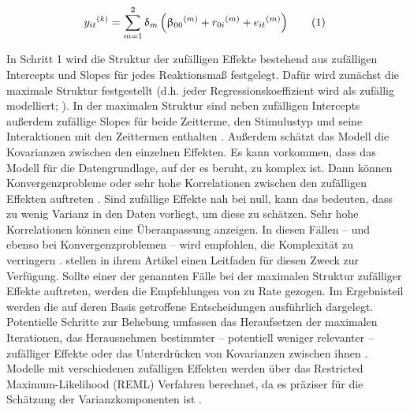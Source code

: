 		\begin{equation*}
			y_{it}{}^{(k)}=\sum^2_{m=1} \updelta_m \left( \upbeta_{00}{}^{(m)}+ 		
			r_{0i}{}^{(m)}+e_{it}{}^{(m)}\right)\nr\label{eq:null2}
		\end{equation*}
	
		In Schritt 1 wird die Struktur der zufälligen Effekte bestehend aus zufälligen Intercepts und Slopes für jedes Reaktionsmaß festgelegt. 
		Dafür wird zunächst die maximale Struktur festgestellt (d.h. jeder Regressionskoeffizient wird als zufällig modelliert; ).
		In der maximalen Struktur sind neben zufälligen Intercepts außerdem zufällige Slopes für beide Zeitterme, den Stimulustyp und seine Interaktionen mit den Zeittermen enthalten \parencite{BRAUER2018}.
		Außerdem schätzt das Modell die Kovarianzen zwischen den einzelnen Effekten.
		Es kann vorkommen, dass das Modell für die Datengrundlage, auf der es beruht, zu komplex ist. Dann können Konvergenzprobleme oder sehr hohe Korrelationen zwischen den zufälligen Effekten auftreten \parencite{BRAUER2018, MATUSCHEK2017}.
		Sind zufällige Effekte nah bei null, kann das bedeuten, dass zu wenig Varianz in den Daten vorliegt, um diese zu schätzen. Sehr hohe Korrelationen können eine Überanpassung anzeigen.
		In diesen Fällen -- und ebenso bei Konvergenzproblemen -- wird empfohlen, die Komplexität zu verringern \parencite{BRAUER2018, MATUSCHEK2017}. 
		\textcite{BRAUER2018} stellen in ihrem Artikel einen Leitfaden für diesen Zweck zur Verfügung. Sollte einer der genannten Fälle bei der maximalen Struktur zufälliger Effekte auftreten, werden die Empfehlungen von \textcite{BRAUER2018} zu Rate gezogen. Im Ergebnisteil werden die auf deren Basis getroffene Entscheidungen ausführlich dargelegt. Potentielle Schritte zur Behebung umfassen das Heraufsetzen der maximalen Iterationen, das Herausnehmen bestimmter -- potentiell weniger relevanter -- zufälliger Effekte oder das Unterdrücken von Kovarianzen zwischen ihnen \parencite{BARR2013, BRAUER2018}. 
	 	Modelle mit verschiedenen zufälligen Effekten werden über das Restricted Maximum-Likelihood (REML) Verfahren berechnet, da es präziser für die Schätzung der Varianzkomponenten ist \parencite[für eine Gegenüberstellung von ML und REML siehe][]{RAUDENBUSH2002}.
		
